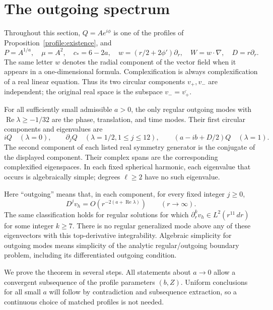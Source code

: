 \section{The outgoing spectrum}\label{sec:spectrum}

Throughout this section, $Q=Ae^{i\phi}$ is one of the profiles of
Proposition~\ref{profile:existence}, and
\[
 P=A^{1/a},\quad \mu=A^2,\quad c_*=6-2a,\quad
 w=(r/2+2\phi')\partial_r,\quad W=w\cdot\nabla,\quad D=r\partial_r.
\]
The same letter $w$ denotes the radial component of the vector field when
it appears in a one-dimensional formula. Complexification is always
complexification of a real linear equation. Thus its two circular
components $v_+,v_-$ are independent; the original real space is the
subspace $v_- =\overline{v_+}$.

\begin{theorem}\label{spectrum:classification}
For all sufficiently small admissible $a>0$, the only regular outgoing
modes with $\operatorname{Re}\lambda\ge-1/32$ are the phase, translation,
and time modes. Their first circular components and eigenvalues are
\[
 iQ\quad(\lambda=0),\qquad
 \partial_jQ\quad(\lambda=1/2, 1\le j\le12),\qquad
 (a-ib+D/2)Q\quad(\lambda=1).
\]
The second component of each listed real symmetry generator is the
conjugate of the displayed component. Their complex spans are the
corresponding complexified eigenspaces. In
each fixed spherical harmonic, each eigenvalue that occurs is
algebraically simple; degrees $\ell\ge2$ have no such eigenvalue.

Here ``outgoing'' means that, in each component, for every fixed integer
$j\ge0$,
\begin{equation}\label{spec:slow-condition}
 D^jv_h=O(r^{-2(a+\operatorname{Re}\lambda)})\qquad(r\longrightarrow\infty).
\end{equation}
The same classification holds for regular solutions for which
$\partial_r^kv_h\in L^2(r^{11}\,dr)$ for some integer $k\ge7$.
There is no regular generalized mode above any of these eigenvectors
with this top-derivative integrability. Algebraic simplicity for
outgoing modes means simplicity of the analytic regular/outgoing
boundary problem, including its differentiated outgoing condition.
\end{theorem}

We prove the theorem in several steps. All statements about $a\to0$
allow a convergent subsequence of the profile parameters $(b,Z)$.
Uniform conclusions for all small $a$ will follow by contradiction and
subsequence extraction, so a continuous choice of matched profiles is
not needed.

